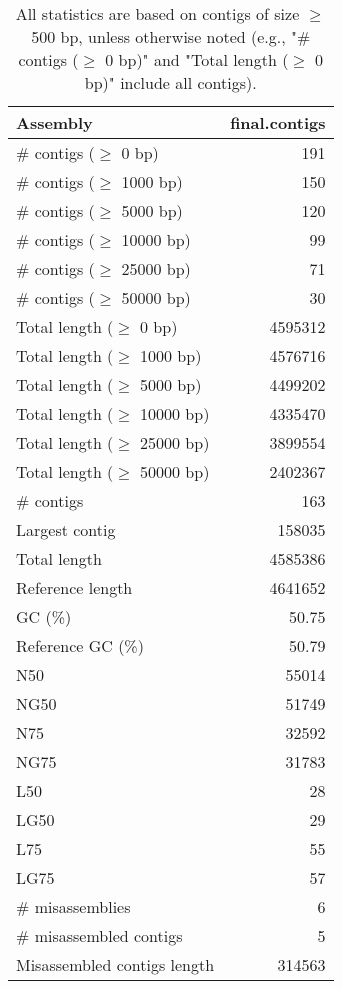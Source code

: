 \documentclass[12pt,a4paper]{article}
\begin{document}
\begin{table}[ht]
\begin{center}
\caption{All statistics are based on contigs of size $\geq$ 500 bp, unless otherwise noted (e.g., "\# contigs ($\geq$ 0 bp)" and "Total length ($\geq$ 0 bp)" include all contigs).}
\begin{tabular}{|l*{1}{|r}|}
\hline
Assembly & final.contigs \\ \hline
\# contigs ($\geq$ 0 bp) & 191 \\ \hline
\# contigs ($\geq$ 1000 bp) & 150 \\ \hline
\# contigs ($\geq$ 5000 bp) & 120 \\ \hline
\# contigs ($\geq$ 10000 bp) & 99 \\ \hline
\# contigs ($\geq$ 25000 bp) & 71 \\ \hline
\# contigs ($\geq$ 50000 bp) & 30 \\ \hline
Total length ($\geq$ 0 bp) & 4595312 \\ \hline
Total length ($\geq$ 1000 bp) & 4576716 \\ \hline
Total length ($\geq$ 5000 bp) & 4499202 \\ \hline
Total length ($\geq$ 10000 bp) & 4335470 \\ \hline
Total length ($\geq$ 25000 bp) & 3899554 \\ \hline
Total length ($\geq$ 50000 bp) & 2402367 \\ \hline
\# contigs & 163 \\ \hline
Largest contig & 158035 \\ \hline
Total length & 4585386 \\ \hline
Reference length & 4641652 \\ \hline
GC (\%) & 50.75 \\ \hline
Reference GC (\%) & 50.79 \\ \hline
N50 & 55014 \\ \hline
NG50 & 51749 \\ \hline
N75 & 32592 \\ \hline
NG75 & 31783 \\ \hline
L50 & 28 \\ \hline
LG50 & 29 \\ \hline
L75 & 55 \\ \hline
LG75 & 57 \\ \hline
\# misassemblies & 6 \\ \hline
\# misassembled contigs & 5 \\ \hline
Misassembled contigs length & 314563 \\ \hline

\end{tabular}
\end{center}
\end{table}
\end{document}
